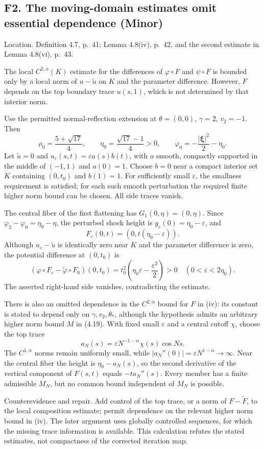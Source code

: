 \documentclass[10pt]{article}
\begin{document}
\subsection*{F2. The moving-domain estimates omit essential dependence (Minor)}
Location. Definition 4.7, p. 41; Lemma 4.8(iv), p. 42, and the second estimate in Lemma 4.8(vi), p. 43.\par
The local \(C^{2,\alpha}(K)\) estimate for the differences of \(\varphi\circ F\) and \(\psi\circ F\) is bounded only by a local norm of \(u-\widetilde u\) on \(K\) and the parameter difference. However, \(F\) depends on the top boundary trace \(u(s,1)\), which is not determined by that interior norm.\par
Use the permitted normal-reflection extension at \(\theta=(0,0)\), \(\gamma=2\), \(v_2=-1\). Then \[\rho_0=\frac{5+\sqrt{17}}4,\qquad
 \eta_0=\frac{\sqrt{17}-1}4>0,\qquad
 \varphi_0=-\frac{|\boldsymbol\xi|^2}{2}-\eta_0.\] Let \(\widetilde u=0\) and \(u_\varepsilon(s,t)=\varepsilon a(s)b(t)\), with \(a\) smooth, compactly supported in the middle of \((-1,1)\) and \(a(0)=1\). Choose \(b=0\) near a compact interior set \(K\) containing \((0,t_0)\) and \(b(1)=1\). For sufficiently small \(\varepsilon\), the smallness requirement is satisfied; for each such smooth perturbation the required finite higher norm bound can be chosen. All side traces vanish.\par
The central fiber of the first flattening has \(G_1(0,\eta)=(0,\eta)\). Since \(\varphi_2-\varphi_0=\eta_0-\eta\), the perturbed shock height is \(g_\varepsilon(0)=\eta_0-\varepsilon\), and \[F_\varepsilon(0,t)=(0,t(\eta_0-\varepsilon)).\] Although \(u_\varepsilon-\widetilde u\) is identically zero near \(K\) and the parameter difference is zero, the potential difference at \((0,t_0)\) is \[(\varphi\circ F_\varepsilon-\widetilde\varphi\circ F_0)(0,t_0)
 =t_0^2\left(\eta_0\varepsilon-\frac{\varepsilon^2}{2}\right)>0
 \quad (0<\varepsilon<2\eta_0).\] The asserted right-hand side vanishes, contradicting the estimate.\par
There is also an omitted dependence in the \(C^{2,\alpha}\) bound for \(F\) in (iv): its constant is stated to depend only on \(\gamma,v_2,\theta_*\), although the hypothesis admits an arbitrary higher norm bound \(M\) in (4.19). With fixed small \(\varepsilon\) and a central cutoff \(\chi\), choose the top trace \[a_N(s)=\varepsilon N^{-1-\alpha}\chi(s)\cos Ns.\] The \(C^{1,\alpha}\) norms remain uniformly small, while \(|a_N''(0)|=\varepsilon N^{1-\alpha}\to\infty\). Near the central fiber the height is \(\eta_0-a_N(s)\), so the second derivative of the vertical component of \(F(s,t)\) equals \(-t a_N''(s)\). Every member has a finite admissible \(M_N\), but no common bound independent of \(M_N\) is possible.\par
Counterevidence and repair. Add control of the top trace, or a norm of \(F-\widetilde F\), to the local composition estimate; permit dependence on the relevant higher norm bound in (iv). The later argument uses globally controlled sequences, for which the missing trace information is available. This calculation refutes the stated estimates, not compactness of the corrected iteration map.\par
\end{document}
